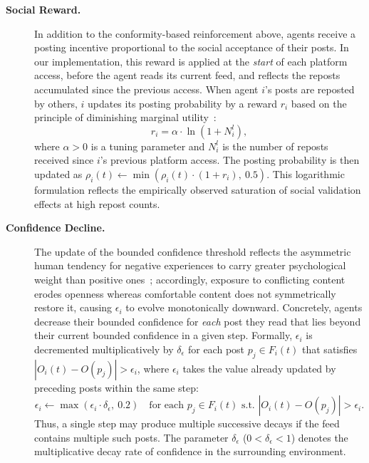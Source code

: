 \documentclass[pdflatex,sn-mathphys-num]{sn-jnl}%
\theoremstyle{thmstyleone}%
\theoremstyle{thmstyletwo}%
\theoremstyle{thmstylethree}%
\def\post{\rho} %
\def\BoundedConfidence{\epsilon}
\begin{document}
\begin{description}
\item[{\bf Social Reward.}] In addition to the conformity-based reinforcement above,
  agents receive a posting incentive proportional to the social acceptance of their posts.
  In our implementation, this reward is applied at the \emph{start} of each platform access,
  before the agent reads its current feed, and reflects the reposts accumulated since the previous access.
  When agent $i$'s posts are reposted by others, $i$ updates its posting probability
  by a reward $r_i$ based on the principle of diminishing marginal utility~\cite{Gossen1983}:
  \begin{equation}\label{eq:SocialReward}
    r_i = \alpha \cdot \ln(1 + N^{l}_i),
  \end{equation}
  where $\alpha > 0$ is a tuning parameter and $N^{l}_i$ is the number of reposts received
  since $i$'s previous platform access. The posting probability is then updated as
  $\post_i(t) \leftarrow \min(\post_i(t) \cdot (1 + r_i),\ 0.5)$.
  This logarithmic formulation reflects the empirically observed saturation of social
  validation effects at high repost counts.

\item[{\bf Confidence Decline.}]
The update of the bounded confidence threshold reflects the asymmetric
  human tendency for negative experiences to carry greater psychological weight
  than positive ones~\cite{Vallone1985,Baumeister2001}; accordingly, exposure to
  conflicting content erodes openness whereas comfortable content does not
  symmetrically restore it, causing $\BoundedConfidence_i$ to evolve monotonically
  downward. Concretely, agents decrease their bounded
  confidence for \emph{each} post they read that lies beyond their current bounded confidence in a given step.
  Formally, $\BoundedConfidence_i$ is decremented multiplicatively by $\delta_{\BoundedConfidence}$ for each post $p_j \in F_i(t)$ that satisfies $|O_i(t) - O(p_j)| > \BoundedConfidence_i$, where $\BoundedConfidence_i$ takes the value already updated by preceding posts within the same step:
  \begin{equation}
    \BoundedConfidence_i \leftarrow \max(\BoundedConfidence_i \cdot \delta_{\BoundedConfidence},\ 0.2)
    \quad \text{for each } p_j \in F_i(t) \text{ s.t. } |O_i(t) - O(p_j)| > \BoundedConfidence_i.
  \end{equation}
  Thus, a single step may produce multiple successive decays if the feed contains multiple such posts.
  The parameter $\delta_{\BoundedConfidence}$ ($0 < \delta_{\BoundedConfidence} < 1$) denotes the multiplicative decay rate of confidence in the surrounding environment.
\end{description}
\end{document}

